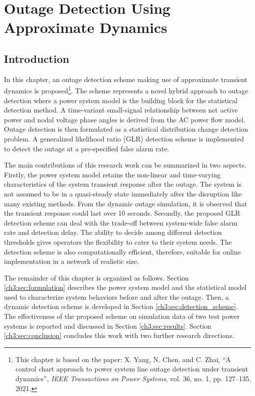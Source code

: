 
\chapter{Outage Detection Using Approximate Dynamics}
\label{ch:detection_using_approximate_dynamics}
\vspace{2em}

\section{Introduction} %
\label{ch3:sec:introduction}

In this chapter, an outage detection scheme making use of approximate transient dynamics is proposed\footnote{This chapter is based on the paper: X. Yang, N. Chen, and C. Zhai, “A control chart approach to power system line outage detection under transient dynamics”, \textit{IEEE Transactions on Power Systems}, vol. 36, no. 1, pp. 127–135, 2021.}. The scheme represents a novel hybrid approach to outage detection where a power system model is the building block for the statistical detection method. A time-variant small-signal relationship between net active power and nodal voltage phase angles is derived from the AC power flow model. Outage detection is then formulated as a statistical distribution change detection problem. A generalized likelihood ratio (GLR) detection scheme is implemented to detect the outage at a pre-specified false alarm rate. 

The main contributions of this research work can be summarized in two aspects. Firstly, the power system model retains the non-linear and time-varying characteristics of the system transient response after the outage. The system is not assumed to be in a quasi-steady state immediately after the disruption like many existing methods. From the dynamic outage simulation, it is observed that the transient response could last over 10 seconds. Secondly, the proposed GLR detection scheme can deal with the trade-off between system-wide false alarm rate and detection delay. The ability to decide among different detection thresholds gives operators the flexibility to cater to their system needs. The detection scheme is also computationally efficient, therefore, suitable for online implementation in a network of realistic size.

The remainder of this chapter is organized as follows. Section \ref{ch3:sec:formulation} describes the power system model and the statistical model used to characterize system behaviors before and after the outage. Then, a dynamic detection scheme is developed in Section \ref{ch3:sec:detection_scheme}. The effectiveness of the proposed scheme on simulation data of two test power systems is reported and discussed in Section \ref{ch3:sec:results}. Section \ref{ch3:sec:conclusion} concludes this work with two further research directions.


